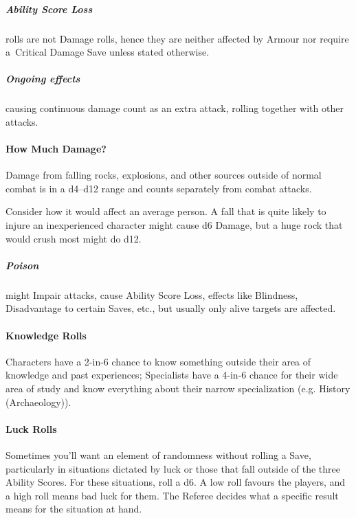 \documentclass[itdr/core]{subfiles}
\begin{document}
\subparagraph{Ability Score Loss} rolls are not Damage rolls, hence they are neither affected by Armour nor require a~Critical Damage Save unless stated otherwise.

\subparagraph{Ongoing effects} causing continuous damage count as an extra attack, rolling together with other attacks.

\vfill

\paragraph{How Much Damage?}
Damage from falling rocks, explosions, and other sources outside of normal combat is in a d4--d12 range and counts separately from combat attacks.

Consider how it would affect an average person. A fall that is quite likely to injure an inexperienced character might cause d6 Damage, but a huge rock that would crush most might do d12.

\subparagraph{Poison} might Impair attacks, cause Ability Score Loss, effects like Blindness, Disadvantage to certain Saves, etc., but usually only alive targets are affected.

\vfill

\paragraph{Knowledge Rolls}
Characters have a 2-in-6 chance to know something outside their area of knowledge and past experiences; Specialists have a 4-in-6 chance for their wide area of study and know everything about their narrow specialization (e.g. History (Archaeology)).

\vfill

\paragraph{Luck Rolls}
Sometimes you'll want an element of randomness without rolling a Save, particularly in situations dictated by luck or those that fall outside of the three Ability Scores. For these situations, roll a d6. A low roll favours the players, and a high roll means bad luck for them. The Referee decides what a specific result means for the situation at hand.

\vfill
\end{document}
